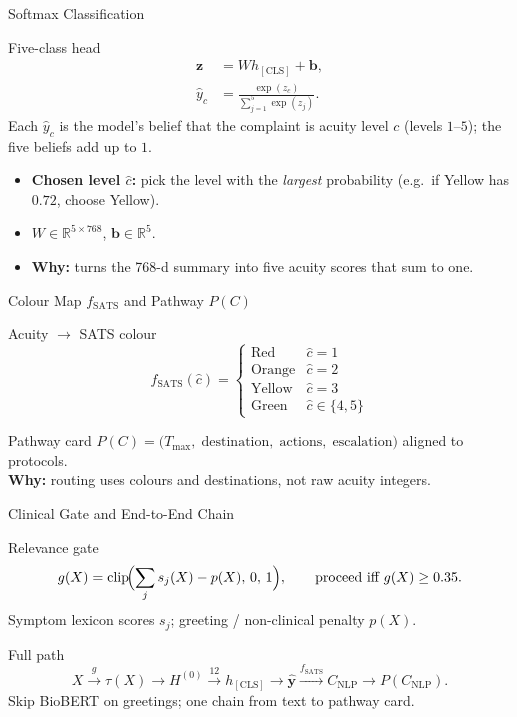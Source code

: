 \begin{frame}{Softmax Classification}
	\begin{block}{Five-class head}
		\[
		\begin{aligned}
		  \mathbf{z} &= W h_{\mathrm{[CLS]}} + \mathbf{b}, \\
		  \hat{y}_c &= \frac{\exp(z_c)}{\sum_{j=1}^{5}\exp(z_j)}.
		\end{aligned}
		\]
		Each \(\hat{y}_c\) is the model's belief that the complaint is acuity level \(c\)
		(levels \(1\)--\(5\)); the five beliefs add up to \(1\).
	\end{block}
	\begin{itemize}
		\item \textbf{Chosen level \(\hat{c}\):} pick the level with the \emph{largest} probability
		(e.g.\ if Yellow has \(0.72\), choose Yellow).
		\item \(W \in \mathbb{R}^{5 \times 768}\), \(\mathbf{b} \in \mathbb{R}^{5}\).
		\item \textbf{Why:} turns the 768-d summary into five acuity scores that sum to one.
	\end{itemize}
\end{frame}

\begin{frame}{Colour Map \(f_{\mathrm{SATS}}\) and Pathway \(P(C)\)}
	\begin{block}{Acuity \(\to\) SATS colour}
		\[
		  f_{\mathrm{SATS}}(\hat{c}) =
		  \begin{cases}
		    \mathrm{Red} & \hat{c}=1 \\
		    \mathrm{Orange} & \hat{c}=2 \\
		    \mathrm{Yellow} & \hat{c}=3 \\
		    \mathrm{Green} & \hat{c}\in\{4,5\}
		  \end{cases}
		\]
	\end{block}
	\begin{exampleblock}{Pathway card}
		\(P(C) = \bigl(T_{\max},\;\mathrm{destination},\;\mathrm{actions},\;\mathrm{escalation}\bigr)\)
		aligned to \examplehospital{} protocols.\\
		\textbf{Why:} routing uses colours and destinations, not raw acuity integers.
	\end{exampleblock}
\end{frame}

\begin{frame}{Clinical Gate and End-to-End Chain}
	\begin{block}{Relevance gate}
		\[
		  g(X) = \mathrm{clip}\!\Bigl(\sum_j s_j(X) - p(X),\, 0,\, 1\Bigr),
		  \qquad \text{proceed iff } g(X) \geq 0.35.
		\]
		Symptom lexicon scores \(s_j\); greeting / non-clinical penalty \(p(X)\).
	\end{block}
	\begin{alertblock}{Full path}
		\[
		  X \xrightarrow{g} \tau(X) \to H^{(0)}
		  \xrightarrow{12} h_{\mathrm{[CLS]}}
		  \to \hat{\mathbf{y}}
		  \xrightarrow{f_{\mathrm{SATS}}} C_{\mathrm{NLP}}
		  \to P(C_{\mathrm{NLP}}).
		\]
		Skip BioBERT on greetings; one chain from text to pathway card.
	\end{alertblock}
\end{frame}

